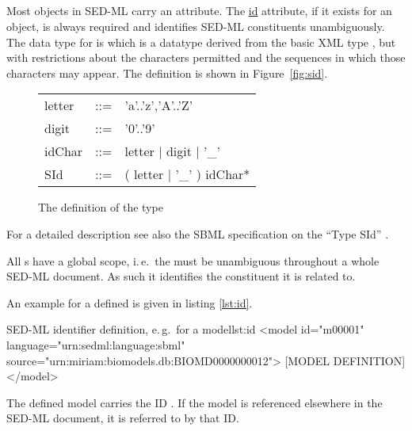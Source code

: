 \subsection{}
\label{sec:id}
%

Most objects in SED-ML carry an  attribute. 
The \hyperref[sec:id]{id} attribute, if it exists for an object, is always required and identifies SED-ML constituents unambiguously.   
The data type for  is  which is a datatype derived from the basic XML type , but with restrictions about the characters permitted and the sequences in which those characters may appear. The definition is shown in
Figure~\vref{fig:sid}.

\begin{figure}[hbt]
  \ttfamily
  \small
  \centering
  \begin{tabular}{lll}
    letter & ::= & 'a'..'z','A'..'Z'\\
    digit  & ::= & '0'..'9'\\
    idChar & ::= & letter | digit | '\_'\\
    SId    & ::= & ( letter | '\_' ) idChar*\\
  \end{tabular}
  \vspace*{-1ex}
  \caption{The definition of the type }
  \label{fig:sid}
\end{figure}

For a detailed description see also the SBML specification on the ``Type SId'' \citep[p. 11]{HBH+10}.

All s have a global scope, i.\,e.\ the  must be unambiguous throughout a whole SED-ML document. As such it identifies the constituent it is related to.

An example for a defined  is given in listing \ref{lst:id}.
%
\begin{myXmlLst}{SED-ML identifier definition, e.\,g.\ for a model}{lst:id}
<model id="m00001" language="urn:sedml:language:sbml" source="urn:miriam:biomodels.db:BIOMD0000000012">
 [MODEL DEFINITION]
</model>
\end{myXmlLst}
%
The defined model carries the ID . If the model is referenced elsewhere in the SED-ML document, it is referred to by that ID.

